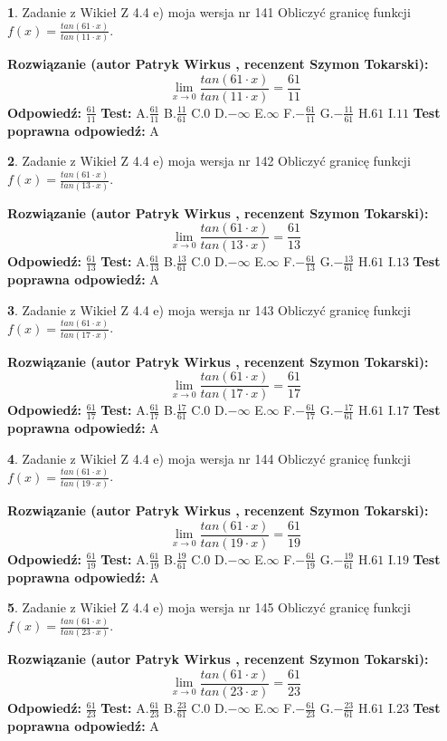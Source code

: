 \documentclass[12pt, a4paper]{article}
\theoremstyle{definition} %
\newtheorem{zad}{}
\newcommand{\zadStart}[1]{\begin{zad}#1\newline}
\newcommand{\zadStop}{\end{zad}}
\newcommand{\rozwStart}[2]{\noindent \textbf{Rozwiązanie (autor #1 , recenzent #2): }\newline}
\newcommand{\rozwStop}{\newline}
\newcommand{\odpStart}{\noindent \textbf{Odpowiedź:}\newline}
\newcommand{\odpStop}{\newline}
\newcommand{\testStart}{\noindent \textbf{Test:}\newline}
\newcommand{\testStop}{\newline}
\newcommand{\kluczStart}{\noindent \textbf{Test poprawna odpowiedź:}\newline}
\newcommand{\kluczStop}{\newline}
\begin{document}
\zadStart{Zadanie z Wikieł Z 4.4 e) moja wersja nr 141}
Obliczyć granicę funkcji $f(x)=\frac{tan(61\cdot x)}{tan(11\cdot x)}$.
\zadStop
\rozwStart{Patryk Wirkus}{Szymon Tokarski}
$$\lim\limits_{x\to 0}\frac{tan(61\cdot x)}{tan(11\cdot x)}=
\frac{61}{11}$$
\rozwStop
\odpStart
$\frac{61}{11}$
\odpStop
\testStart
A.$\frac{61}{11}$
B.$\frac{11}{61}$
C.$0$
D.$-\infty$
E.$\infty$
F.$-\frac{61}{11}$
G.$-\frac{11}{61}$
H.$61$
I.$11$
\testStop
\kluczStart
A
\kluczStop



\zadStart{Zadanie z Wikieł Z 4.4 e) moja wersja nr 142}
Obliczyć granicę funkcji $f(x)=\frac{tan(61\cdot x)}{tan(13\cdot x)}$.
\zadStop
\rozwStart{Patryk Wirkus}{Szymon Tokarski}
$$\lim\limits_{x\to 0}\frac{tan(61\cdot x)}{tan(13\cdot x)}=
\frac{61}{13}$$
\rozwStop
\odpStart
$\frac{61}{13}$
\odpStop
\testStart
A.$\frac{61}{13}$
B.$\frac{13}{61}$
C.$0$
D.$-\infty$
E.$\infty$
F.$-\frac{61}{13}$
G.$-\frac{13}{61}$
H.$61$
I.$13$
\testStop
\kluczStart
A
\kluczStop



\zadStart{Zadanie z Wikieł Z 4.4 e) moja wersja nr 143}
Obliczyć granicę funkcji $f(x)=\frac{tan(61\cdot x)}{tan(17\cdot x)}$.
\zadStop
\rozwStart{Patryk Wirkus}{Szymon Tokarski}
$$\lim\limits_{x\to 0}\frac{tan(61\cdot x)}{tan(17\cdot x)}=
\frac{61}{17}$$
\rozwStop
\odpStart
$\frac{61}{17}$
\odpStop
\testStart
A.$\frac{61}{17}$
B.$\frac{17}{61}$
C.$0$
D.$-\infty$
E.$\infty$
F.$-\frac{61}{17}$
G.$-\frac{17}{61}$
H.$61$
I.$17$
\testStop
\kluczStart
A
\kluczStop



\zadStart{Zadanie z Wikieł Z 4.4 e) moja wersja nr 144}
Obliczyć granicę funkcji $f(x)=\frac{tan(61\cdot x)}{tan(19\cdot x)}$.
\zadStop
\rozwStart{Patryk Wirkus}{Szymon Tokarski}
$$\lim\limits_{x\to 0}\frac{tan(61\cdot x)}{tan(19\cdot x)}=
\frac{61}{19}$$
\rozwStop
\odpStart
$\frac{61}{19}$
\odpStop
\testStart
A.$\frac{61}{19}$
B.$\frac{19}{61}$
C.$0$
D.$-\infty$
E.$\infty$
F.$-\frac{61}{19}$
G.$-\frac{19}{61}$
H.$61$
I.$19$
\testStop
\kluczStart
A
\kluczStop



\zadStart{Zadanie z Wikieł Z 4.4 e) moja wersja nr 145}
Obliczyć granicę funkcji $f(x)=\frac{tan(61\cdot x)}{tan(23\cdot x)}$.
\zadStop
\rozwStart{Patryk Wirkus}{Szymon Tokarski}
$$\lim\limits_{x\to 0}\frac{tan(61\cdot x)}{tan(23\cdot x)}=
\frac{61}{23}$$
\rozwStop
\odpStart
$\frac{61}{23}$
\odpStop
\testStart
A.$\frac{61}{23}$
B.$\frac{23}{61}$
C.$0$
D.$-\infty$
E.$\infty$
F.$-\frac{61}{23}$
G.$-\frac{23}{61}$
H.$61$
I.$23$
\testStop
\kluczStart
A
\kluczStop
\end{document}
